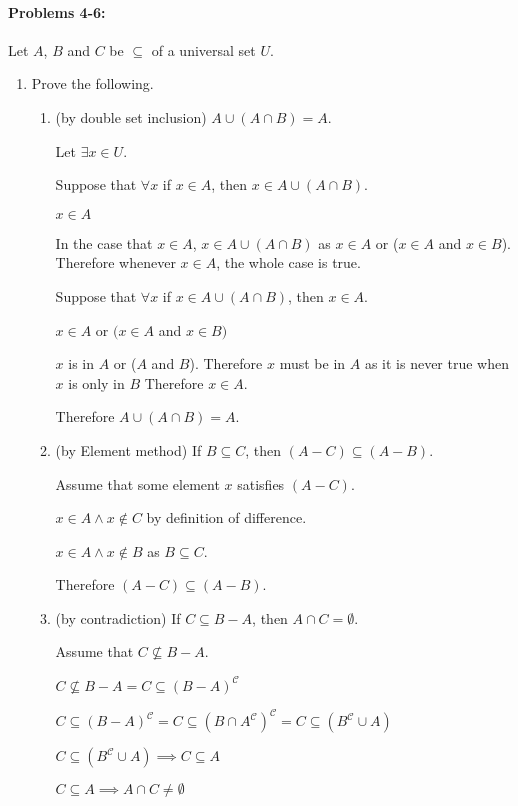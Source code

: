 \documentclass[12pt,letterpaper,titlepage]{article}
\begin{document}
\begin{raggedright}
\paragraph{Problems 4-6:} Let $A$, $B$ and $C$ be $\subseteq$ of a universal set $U$.

\begin{enumerate}[resume]
\item Prove the following.
\begin{enumerate}[label=(\alph*)]
\item (by double set inclusion) $A\cup(A\cap B) = A$.

Let $\exists x \in U$. 


Suppose that $\forall x$ if $x \in A$, then $x \in A\cup(A\cap B)$.

$x\in A$

In the case that $x\in A$, $x \in A\cup(A\cap B)$ as $x\in A$ or ($x\in A$ and $x\in B$). Therefore whenever $x\in A$, the whole case is true.

Suppose that $\forall x$ if $x \in A\cup(A\cap B)$, then $x \in A$.

$x\in A$ or $(x\in A$ and $x\in B)$ 

$x$ is in $A$ or ($A$ and $B$). Therefore $x$ must be in $A$ as it is never true when $x$ is only in $B$ Therefore $x\in A$.

Therefore $A\cup(A\cap B) = A$.

\item (by Element method) If $B\subseteq C$, then $(A-C)\subseteq (A-B)$.

Assume that some element $x$ satisfies $(A-C)$.

$x\in A \land x\notin C$ by definition of difference.

$x\in A \land x\notin B$ as $B \subseteq C$.

Therefore $(A-C)\subseteq (A-B)$.

\clearpage

\item (by contradiction) If $C\subseteq B-A$, then $A\cap C=\emptyset$.

Assume that $C\not\subseteq B-A$.

$C\not\subseteq B-A = C\subseteq (B-A)^\mathcal{C}$

$C\subseteq (B-A)^\mathcal{C} = C\subseteq (B\cap A^\mathcal{C})^\mathcal{C} = C\subseteq (B^\mathcal{C}\cup A)$

$C\subseteq (B^\mathcal{C}\cup A)\implies C\subseteq A$

$C\subseteq A\implies A\cap C \neq \emptyset$


\end{enumerate}
\end{enumerate}
\end{raggedright}
\end{document}
